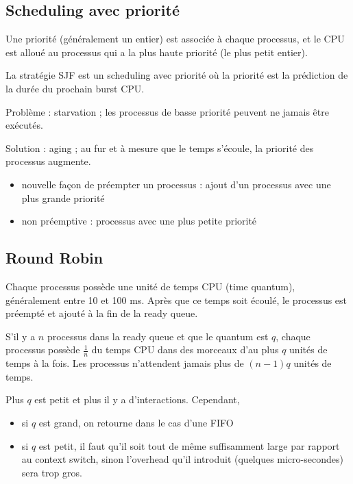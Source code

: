 \subsection{Scheduling avec priorité}

Une priorité (généralement un entier) est associée à chaque processus, et le CPU est alloué au processus qui a la plus haute priorité (le plus petit entier).

La stratégie SJF est un scheduling avec priorité où la priorité est la prédiction de la durée du prochain burst CPU.

Problème : starvation ; les processus de basse priorité peuvent ne jamais être exécutés.

Solution : aging ; au fur et à mesure que le temps s'écoule, la priorité des processus augmente.


\begin{itemize}
	\item nouvelle façon de préempter un processus : ajout d'un processus avec une plus grande priorité
	\item non préemptive : processus avec une plus petite priorité
\end{itemize}

\subsection{Round Robin}

Chaque processus possède une unité de temps CPU (time quantum), généralement entre 10 et 100 ms. Après que ce temps soit écoulé, le processus est préempté et ajouté à la fin de la ready queue.

S'il y a $n$ processus dans la ready queue et que le quantum est $q$, chaque processus possède $\frac{1}{n}$ du temps CPU dans des morceaux d'au plus $q$ unités de temps à la fois. Les processus n'attendent jamais plus de $(n - 1)q$ unités de temps.

Plus $q$ est petit et plus il y a d'interactions. Cependant,

\begin{itemize}
	\item si $q$ est grand, on retourne dans le cas d'une FIFO
	\item si $q$ est petit, il faut qu'il soit tout de même suffisamment large par rapport au context switch, sinon l'overhead qu'il introduit (quelques micro-secondes) sera trop gros.
\end{itemize}

